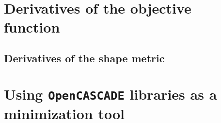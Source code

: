 
\Appendix
\def\baselinestretch{1}
\addappheadtotoc
\appendixpage


\cleardoublepage
\chapter{Derivatives of the objective function}
\label{chp:Deriv-objective-function-app}
\thispagestyle{empty}

\section{Derivatives of the shape metric}
\label{sec:Derivatives_of_the_shape_parameter}

\cleardoublepage
\chapter{Using \texttt{OpenCASCADE} libraries as a minimization tool}
\label{chp:opencascade}
\thispagestyle{empty}



